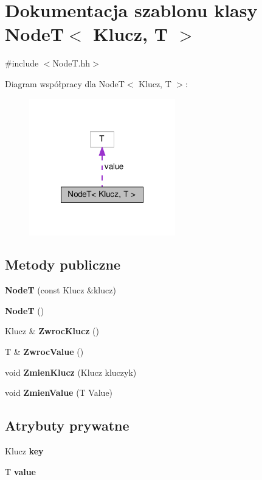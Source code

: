 \section{Dokumentacja szablonu klasy Node\-T$<$ Klucz, T $>$}
\label{class_node_t}


{\ttfamily \#include $<$Node\-T.\-hh$>$}



Diagram współpracy dla Node\-T$<$ Klucz, T $>$\-:
\nopagebreak
\begin{figure}[H]
\begin{center}
\leavevmode
\includegraphics[width=180pt]{class_node_t__coll__graph}
\end{center}
\end{figure}
\subsection*{Metody publiczne}
\begin{DoxyCompactItemize}
\item 
{\bf Node\-T} (const Klucz \&klucz)
\item 
{\bf Node\-T} ()
\item 
Klucz \& {\bf Zwroc\-Klucz} ()
\item 
T \& {\bf Zwroc\-Value} ()
\item 
void {\bf Zmien\-Klucz} (Klucz kluczyk)
\item 
void {\bf Zmien\-Value} (T Value)
\end{DoxyCompactItemize}
\subsection*{Atrybuty prywatne}
\begin{DoxyCompactItemize}
\item 
Klucz {\bf key}
\item 
T {\bf value}
\end{DoxyCompactItemize}


